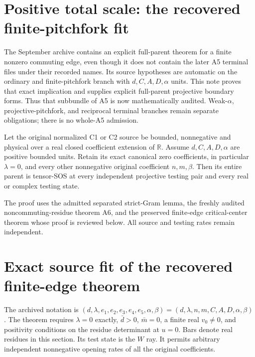 

\section{Positive total scale: the recovered finite-pitchfork fit}

The September archive contains an explicit full-parent theorem for a
finite nonzero commuting edge, even though it does not contain the later
A5 terminal files under their recorded names. Its source hypotheses are
automatic on the ordinary and finite-pitchfork branch with
$d,C,A,D,\alpha$ units. This note proves that exact implication and
supplies explicit full-parent projective boundary forms. Thus that
subbundle of A5 is now mathematically audited. Weak-$\alpha$,
projective-pitchfork, and reciprocal terminal branches remain separate
obligations; there is no whole-A5 admission.

\begin{theorem}
Let the original normalized C1 or C2 source be bounded, nonnegative and
physical over a real closed coefficient extension of $\mathbb R$.
Assume $d,C,A,D,\alpha$ are positive bounded units. Retain its exact
canonical zero coefficients, in particular $\lambda=0$, and every
other nonnegative original coefficient $n,m,\beta$. Then its entire
parent is tensor-SOS at every independent projective testing pair and
every real or complex testing state.
\end{theorem}

The proof uses the admitted separated strict-Gram lemma, the freshly
audited noncommuting-residue theorem A6, and the preserved finite-edge
critical-center theorem whose proof is reviewed below. All source and
testing rates remain independent.

\section{Exact source fit of the recovered finite-edge theorem}

The archived notation is
$(d,\lambda,e_1,e_2,e_3,e_4,e_5,\alpha,\beta)
=(d,\lambda,n,m,C,A,D,\alpha,\beta)$.
The theorem requires $\lambda=0$ exactly, $\bar d>0$, $\bar m=0$,
a finite real $v_0\ne0$, and positivity conditions on the residue
determinant at $u=0$. Bars denote real residues in this section.
Its test state is the $W$ ray. It permits arbitrary independent
nonnegative opening rates of all the original coefficients.

